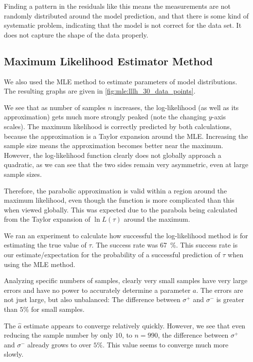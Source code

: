Finding a pattern in the residuals like this means the measurements are not randomly distributed around the model prediction, and that there is some kind of systematic problem, indicating that the model is not correct for the data set. It does not capture the shape of the data properly.


\subsection{Maximum Likelihood Estimator Method}

We also used the MLE method to estimate parameters of model distributions. The resulting graphs are given in \autoref{fig:mle:lllh_30_data_points}.

We see that as number of samples $n$ increases, the log-likelihood (as well as its approximation) gets much more strongly peaked (note the changing $y$-axis scales). The maximum likelihood is correctly predicted by both calculations, because the approximation is a Taylor expansion around the MLE. Increasing the sample size means the approximation becomes better near the maximum. However, the log-likelihood function clearly does not globally approach a quadratic, as we can see that the two sides remain very asymmetric, even at large sample sizes.

Therefore, the parabolic approximation is valid within a region around the maximum likelihood, even though the function is more complicated than this when viewed globally. This was expected due to the parabola being calculated from the Taylor expansion of $\ln L(\tau)$ around the maximum.

We ran an experiment to calculate how successful the log-likelihood method is for estimating the true value of \( \tau \). The success rate was \qty{67}{\percent}. This success rate is our estimate/expectation for the probability of a successful prediction of \( \tau \) when using the MLE method.

Analyzing specific numbers of samples, clearly very small samples have very large errors and have no power to accurately determine a parameter $a$. The errors are not just large, but also unbalanced: The difference between $\sigma^+$ and $\sigma^-$ is greater than $5 \%$ for small samples.

The $\hat{a}$ estimate appears to converge relatively quickly. However, we see that even reducing the sample number by only $10$, to $n = 990$, the difference between $\sigma^+$ and $\sigma^-$ already grows to over $5 \%$. This value seems to converge much more slowly.


